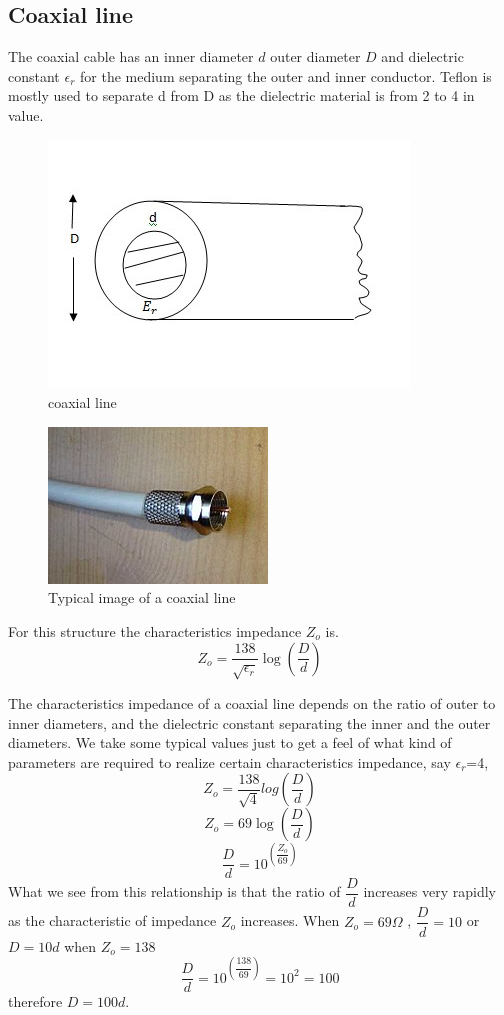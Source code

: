 \subsection{Coaxial line}
The coaxial cable has an inner diameter $d$ outer  diameter $D$ and dielectric constant $\epsilon_r$ for the medium separating the outer and inner conductor. Teflon is mostly used to separate d from D as the dielectric material is from 2 to 4 in value.
\begin{figure}[h]
\centering
\includegraphics[width=1\linewidth]{./graphics/coaxialcable1}
\caption{coaxial line}
\end{figure}
\begin{figure}[h]
\centering
\includegraphics[scale=0.8]{./graphics/coaxialcable}
\caption{Typical image of a coaxial line}
\end{figure}

For this structure the characteristics impedance $Z_o$ is.
\begin{equation*}
Z_o=\dfrac{138}{\sqrt{\epsilon_r}}\log(\dfrac{D}{d})
\end{equation*}

The characteristics impedance of a coaxial line depends on the ratio of outer to inner diameters, and the dielectric constant separating the inner and the outer diameters.
We take some typical values just to get a feel of what kind of parameters are required to realize certain characteristics impedance, say $\epsilon_r$=4, $$Z_o=\dfrac{138}{\sqrt{4}}log(\dfrac{D}{d})$$ $$Z_o=69\log(\dfrac{D}{d})$$ $$\dfrac{D}{d}=10^{(\dfrac{Z_o}{69})}$$
What we see from this relationship is that the ratio of $\dfrac{D}{d}$  increases very rapidly as the characteristic of impedance $Z_o$ increases. When $Z_o=69\varOmega$ , $\dfrac{D}{d}=10$ or  $D=10d$ when $Z_o = 138$
\begin{dmath*}
\dfrac{D}{d}=10^{(\dfrac{138}{69})}=10^{2}=100
\end{dmath*}
therefore $D=100d$.

